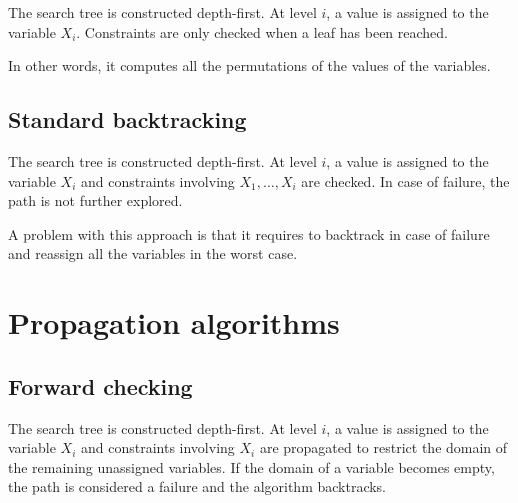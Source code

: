 The search tree is constructed depth-first. 
At level $i$, a value is assigned to the variable $X_i$.
Constraints are only checked when a leaf has been reached.

In other words, it computes all the permutations of the values of the variables.


\subsection{Standard backtracking}

The search tree is constructed depth-first. 
At level $i$, a value is assigned to the variable $X_i$ and 
constraints involving $X_1, \dots, X_i$ are checked.
In case of failure, the path is not further explored.

A problem with this approach is that it requires to backtrack in case of failure
and reassign all the variables in the worst case.



\section{Propagation algorithms}

\subsection{Forward checking}

The search tree is constructed depth-first. 
At level $i$, a value is assigned to the variable $X_i$ and 
constraints involving $X_i$ are propagated
to restrict the domain of the remaining unassigned variables.
If the domain of a variable becomes empty, the path is considered a failure and the algorithm backtracks.


